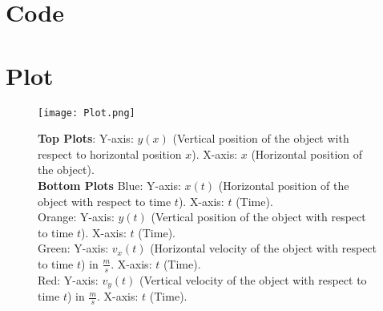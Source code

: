 \documentclass[a4paper,11pt]{article}
\numberwithin{equation}{section}
\numberwithin{figure}{section}
\begin{document}
\section{Code}




\newpage
\section{Plot}

\begin{figure}[h]
    \centering
    \texttt{[image: Plot.png]}
    \caption{\small
\textbf{Top Plots}:
Y-axis: $y(x)$ (Vertical position of the object with respect to horizontal position $x$).
X-axis: $x$ (Horizontal position of the object).\\
\textbf{Bottom Plots}
Blue:
Y-axis: $x(t)$ (Horizontal position of the object with respect to time $t$).
X-axis: $t$ (Time).\\
Orange:
Y-axis: $y(t)$ (Vertical position of the object with respect to time $t$).
X-axis: $t$ (Time).\\
Green:
Y-axis: $v_x(t)$ (Horizontal velocity of the object with respect to time $t$) in $\frac{m}{s}$.
X-axis: $t$ (Time).\\
Red:
Y-axis: $v_y(t)$ (Vertical velocity of the object with respect to time $t$) in $\frac{m}{s}$.
X-axis: $t$ (Time).}

\end{figure}
\end{document}
